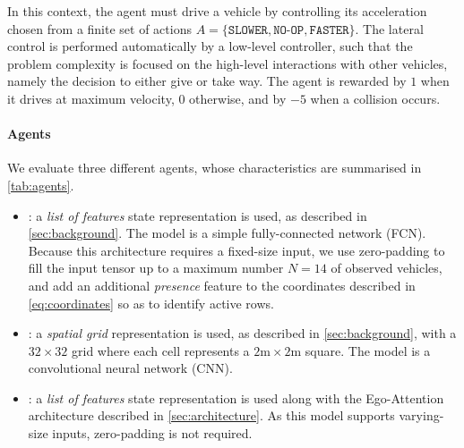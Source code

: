 In this context, the agent must drive a vehicle by controlling its acceleration chosen from a finite set of actions $A = \{\texttt{SLOWER}, \texttt{NO-OP}, \texttt{FASTER}\}$. The lateral control is performed automatically by a low-level controller, such that the problem complexity is focused on the high-level interactions with other vehicles, namely the decision to either give or take way. The agent is rewarded by $1$ when it drives at maximum velocity, $0$ otherwise, and by $-5$ when a collision occurs.

\paragraph{Agents}

We evaluate three different agents, whose characteristics are summarised in \autoref{tab:agents}.
\begin{itemize}
	\item \MLPL: a \emph{list of features} state representation is used, as described in \autoref{sec:background}. The model is a simple fully-connected network (FCN). Because this architecture requires a fixed-size input, we use zero-padding to fill the input tensor up to a maximum number $N=14$ of observed vehicles, and add an additional \emph{presence} feature to the coordinates described in \eqref{eq:coordinates} so as to identify active rows.
	\item \CNNG: a \emph{spatial grid} representation is used, as described in \autoref{sec:background}, with a $32 \times 32$ grid where each cell represents a $2\text{m}\times 2$m square. The model is a convolutional neural network (CNN).
	\item \EgoAtt: a \emph{list of features} state representation is used along with the Ego-Attention architecture described in \autoref{sec:architecture}. As this model supports varying-size inputs, zero-padding is not required.
\end{itemize}

